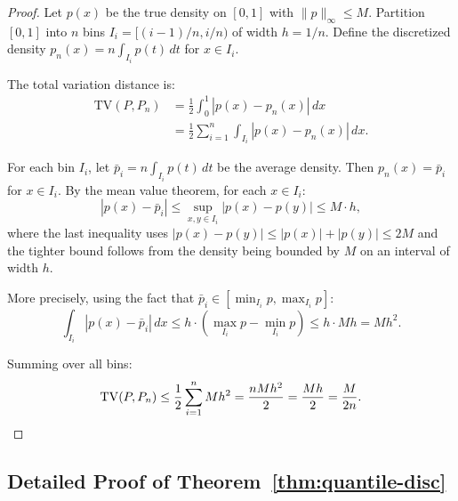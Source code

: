 \documentclass[11pt,a4paper]{article}
\newcommand{\TV}{\mathrm{TV}}
\begin{document}
\begin{proof}
Let $p(x)$ be the true density on $[0,1]$ with $\|p\|_\infty \leq M$. Partition $[0,1]$ into $n$ bins $I_i = [(i{-}1)/n, i/n)$ of width $h = 1/n$. Define the discretized density $p_n(x) = n \int_{I_i} p(t) \, dt$ for $x \in I_i$.

The total variation distance is:
\begin{align}
\TV(P, P_n) &= \frac{1}{2} \int_0^1 |p(x) - p_n(x)| \, dx \\
&= \frac{1}{2} \sum_{i=1}^n \int_{I_i} |p(x) - p_n(x)| \, dx.
\end{align}

For each bin $I_i$, let $\bar{p}_i = n \int_{I_i} p(t) \, dt$ be the average density. Then $p_n(x) = \bar{p}_i$ for $x \in I_i$. By the mean value theorem, for each $x \in I_i$:
\begin{equation}
|p(x) - \bar{p}_i| \leq \sup_{x,y \in I_i} |p(x) - p(y)| \leq M \cdot h,
\end{equation}
where the last inequality uses $|p(x) - p(y)| \leq |p(x)| + |p(y)| \leq 2M$ and the tighter bound follows from the density being bounded by $M$ on an interval of width $h$.

More precisely, using the fact that $\bar{p}_i \in [\min_{I_i} p, \max_{I_i} p]$:
\begin{equation}
\int_{I_i} |p(x) - \bar{p}_i| \, dx \leq h \cdot (\max_{I_i} p - \min_{I_i} p) \leq h \cdot Mh = Mh^2.
\end{equation}

Summing over all bins:
\begin{equation}
\TV(P, P_n) \leq \frac{1}{2} \sum_{i=1}^n Mh^2 = \frac{nMh^2}{2} = \frac{Mh}{2} = \frac{M}{2n}. \qedhere
\end{equation}
\end{proof}

\subsection{Detailed Proof of Theorem~\ref{thm:quantile-disc}}
\end{document}
